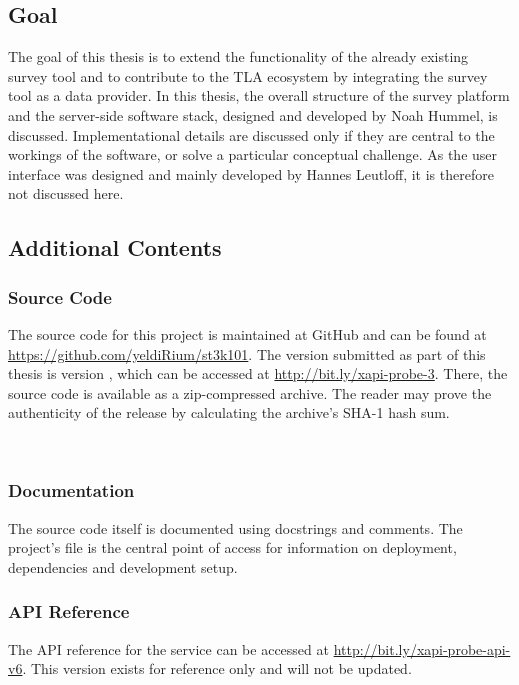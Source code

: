 \subsection{Goal}
    The goal of this thesis is to extend the functionality of the already existing
    survey tool and to contribute to the TLA ecosystem by integrating the
    survey tool as a data provider. In this thesis, the overall structure of the 
    survey platform and the server-side software stack, designed and developed 
    by Noah Hummel, is discussed. Implementational details are discussed only 
    if they are central to the workings of the software, or solve a particular 
    conceptual challenge. As the user interface was designed and mainly developed by 
    Hannes Leutloff, it is therefore not discussed here.

\subsection{Additional Contents}
\subsubsection{Source Code}
    The source code for this project is maintained at GitHub and can be found at
    \url{https://github.com/yeldiRium/st3k101}.
    The version submitted as part of this thesis is version , 
    which can be accessed at \url{http://bit.ly/xapi-probe-3}. There, the
    source code is available as a zip-compressed archive. The reader may
    prove the authenticity of the release by calculating the archive's
    SHA-1 hash sum. \\
     
     
    \\[1em]

\subsubsection{Documentation}
    The source code itself is documented using docstrings and comments.
    The project's  file is the central point of access
    for information on deployment, dependencies and development
    setup.

\subsubsection{API Reference}
    The API reference for the  service can be accessed
    at \url{http://bit.ly/xapi-probe-api-v6}. This version exists
    for reference only and will not be updated.